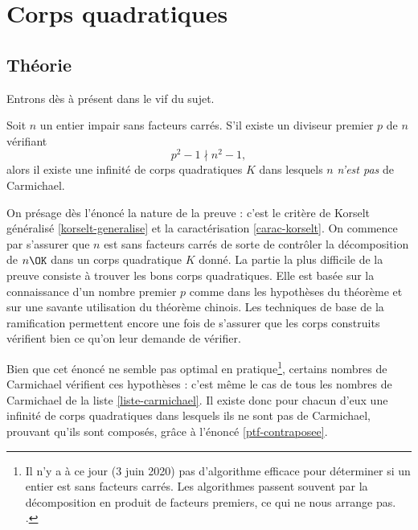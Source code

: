 \section{Corps quadratiques}

\subsection{Théorie}

Entrons dès à présent dans le vif du sujet. 

\begin{theoreme}\label{theoreme-2.5}
	Soit $n$ un entier impair sans facteurs carrés. S'il existe un diviseur premier $p$ de $n$ vérifiant $$p^2 - 1 \nmid n^2 - 1,$$ alors il existe une infinité de corps quadratiques $K$ dans lesquels $n$ \emph{n'est pas} de Carmichael.
\end{theoreme}

\begin{MotSurPreuve}
	On présage dès l'énoncé la nature de la preuve : c'est le critère de Korselt généralisé \ref{korselt-generalise} et la caractérisation \ref{carac-korselt}. On commence par s'assurer que $n$ est sans facteurs carrés de sorte de contrôler la décomposition de $n\OK$ dans un corps quadratique $K$ donné. La partie la plus difficile de la preuve consiste à trouver les bons corps quadratiques. Elle est basée sur la connaissance d'un nombre premier $p$ comme dans les hypothèses du théorème et sur une savante utilisation du théorème chinois. Les techniques de base de la ramification permettent encore une fois de s'assurer que les corps construits vérifient bien ce qu'on leur demande de vérifier. \\
\end{MotSurPreuve}

Bien que cet énoncé ne semble pas optimal en pratique\footnote{Il n'y a à ce jour (3 juin 2020) pas d'algorithme efficace pour déterminer si un entier est sans facteurs carrés. Les algorithmes passent souvent par la décomposition en produit de facteurs premiers, ce qui ne nous arrange pas. .}, certains nombres de Carmichael vérifient ces hypothèses : c'est même le cas de tous les nombres de Carmichael de la liste \ref{liste-carmichael}. Il existe donc pour chacun d'eux une infinité de corps quadratiques dans lesquels ils ne sont pas de Carmichael, prouvant qu'ils sont composés, grâce à l'énoncé \ref{ptf-contraposee}. \\

